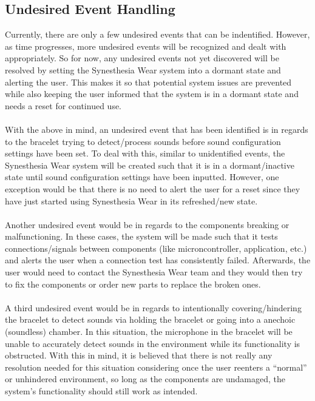 \documentclass[12pt, titlepage]{article}
\begin{document}
\subsection{Undesired Event Handling}
Currently, there are only a few undesired events that can be indentified. However, as time progresses, more undesired events will be recognized and dealt with appropriately. 
So for now, any undesired events not yet discovered will be resolved by setting the Synesthesia Wear system into a dormant state and alerting the user. This makes it so that potential system issues are prevented while also keeping the user informed that the system is in a dormant state and needs a reset for continued use. \\ \\ 
With the above in mind, an undesired event that has been identified is in regards to the bracelet trying to detect/process sounds before sound configuration settings have been set.
To deal with this, similar to unidentified events, the Synesthesia Wear system will be created such that it is in a dormant/inactive state until sound configuration settings have been inputted.
However, one exception would be that there is no need to alert the user for a reset since they have just started using Synesthesia Wear in its refreshed/new state. \\\\
Another undesired event would be in regards to the components breaking or malfunctioning. In these cases, the system will be made such that it tests connections/signals between components (like microncontroller, application, etc.) and alerts the user when a connection test has consistently failed.
Afterwards, the user would need to contact the Synesthesia Wear team and they would then try to fix the components or order new parts to replace the broken ones. \\\\
A third undesired event would be in regards to intentionally covering/hindering the bracelet to detect sounds via holding the bracelet or going into a anechoic (soundless) chamber.
In this situation, the microphone in the bracelet will be unable to accurately detect sounds in the environment while its functionality is obstructed. With this in mind, it is believed that there is not really any resolution needed for this situation considering once the user reenters a ``normal'' or unhindered environment, so long as the components are undamaged, the system's functionality should still work as intended. 
\end{document}
